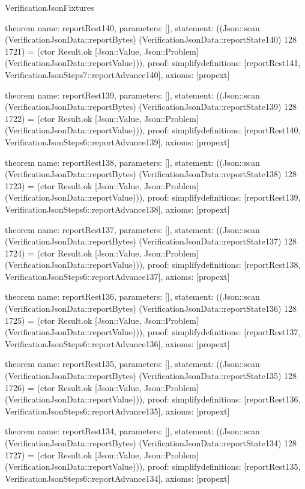 \begin{lexlean}{VerificationJsonFixtures}
\begin{semanticmodule}
theorem{
  name: reportRest140,
  parameters: [],
  statement: ((Json::scan (VerificationJsonData::reportBytes) (VerificationJsonData::reportState140) 128 1721) = (ctor Result.ok [Json::Value, Json::Problem] (VerificationJsonData::reportValue))),
  proof: simplify{definitions: [reportRest141, VerificationJsonSteps7::reportAdvance140]},
  axioms: [propext]
}

theorem{
  name: reportRest139,
  parameters: [],
  statement: ((Json::scan (VerificationJsonData::reportBytes) (VerificationJsonData::reportState139) 128 1722) = (ctor Result.ok [Json::Value, Json::Problem] (VerificationJsonData::reportValue))),
  proof: simplify{definitions: [reportRest140, VerificationJsonSteps6::reportAdvance139]},
  axioms: [propext]
}

theorem{
  name: reportRest138,
  parameters: [],
  statement: ((Json::scan (VerificationJsonData::reportBytes) (VerificationJsonData::reportState138) 128 1723) = (ctor Result.ok [Json::Value, Json::Problem] (VerificationJsonData::reportValue))),
  proof: simplify{definitions: [reportRest139, VerificationJsonSteps6::reportAdvance138]},
  axioms: [propext]
}

theorem{
  name: reportRest137,
  parameters: [],
  statement: ((Json::scan (VerificationJsonData::reportBytes) (VerificationJsonData::reportState137) 128 1724) = (ctor Result.ok [Json::Value, Json::Problem] (VerificationJsonData::reportValue))),
  proof: simplify{definitions: [reportRest138, VerificationJsonSteps6::reportAdvance137]},
  axioms: [propext]
}

theorem{
  name: reportRest136,
  parameters: [],
  statement: ((Json::scan (VerificationJsonData::reportBytes) (VerificationJsonData::reportState136) 128 1725) = (ctor Result.ok [Json::Value, Json::Problem] (VerificationJsonData::reportValue))),
  proof: simplify{definitions: [reportRest137, VerificationJsonSteps6::reportAdvance136]},
  axioms: [propext]
}

theorem{
  name: reportRest135,
  parameters: [],
  statement: ((Json::scan (VerificationJsonData::reportBytes) (VerificationJsonData::reportState135) 128 1726) = (ctor Result.ok [Json::Value, Json::Problem] (VerificationJsonData::reportValue))),
  proof: simplify{definitions: [reportRest136, VerificationJsonSteps6::reportAdvance135]},
  axioms: [propext]
}

theorem{
  name: reportRest134,
  parameters: [],
  statement: ((Json::scan (VerificationJsonData::reportBytes) (VerificationJsonData::reportState134) 128 1727) = (ctor Result.ok [Json::Value, Json::Problem] (VerificationJsonData::reportValue))),
  proof: simplify{definitions: [reportRest135, VerificationJsonSteps6::reportAdvance134]},
  axioms: [propext]
}


\end{semanticmodule}
\end{lexlean}
